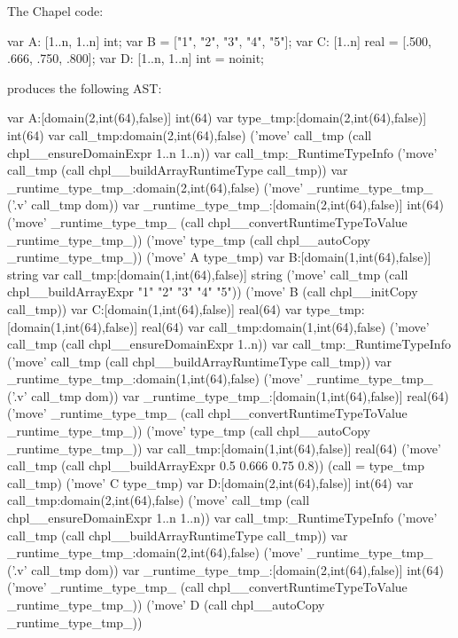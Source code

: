 The Chapel code:
\begin{chapel}
  var A: [1..n, 1..n] int;
  var B = ["1", "2", "3", "4", "5"];
  var C: [1..n] real = [.500, .666, .750, .800];
  var D: [1..n, 1..n] int = noinit;
\end{chapel}
\noindent
produces the following AST:
\begin{numberedchapel}
    var A:[domain(2,int(64),false)] int(64)
    {
      var type_tmp:[domain(2,int(64),false)] int(64)
      var call_tmp:domain(2,int(64),false)
      ('move' call_tmp (call chpl__ensureDomainExpr 1..n 1..n))
      var call_tmp:_RuntimeTypeInfo
      ('move' call_tmp (call chpl__buildArrayRuntimeType call_tmp))
      var _runtime_type_tmp_:domain(2,int(64),false)
      ('move' _runtime_type_tmp_ ('.v' call_tmp dom))
      var _runtime_type_tmp_:[domain(2,int(64),false)] int(64)
      ('move' _runtime_type_tmp_ (call chpl__convertRuntimeTypeToValue _runtime_type_tmp_))
      ('move' type_tmp (call chpl__autoCopy _runtime_type_tmp_))
      ('move' A type_tmp)
    }
    var B:[domain(1,int(64),false)] string
    var call_tmp:[domain(1,int(64),false)] string
    ('move' call_tmp (call chpl__buildArrayExpr "1" "2" "3" "4" "5"))
    ('move' B (call chpl__initCopy call_tmp))
    var C:[domain(1,int(64),false)] real(64)
    {
      var type_tmp:[domain(1,int(64),false)] real(64)
      var call_tmp:domain(1,int(64),false)
      ('move' call_tmp (call chpl__ensureDomainExpr 1..n))
      var call_tmp:_RuntimeTypeInfo
      ('move' call_tmp (call chpl__buildArrayRuntimeType call_tmp))
      var _runtime_type_tmp_:domain(1,int(64),false)
      ('move' _runtime_type_tmp_ ('.v' call_tmp dom))
      var _runtime_type_tmp_:[domain(1,int(64),false)] real(64)
      ('move' _runtime_type_tmp_ (call chpl__convertRuntimeTypeToValue _runtime_type_tmp_))
      ('move' type_tmp (call chpl__autoCopy _runtime_type_tmp_))
      var call_tmp:[domain(1,int(64),false)] real(64)
      ('move' call_tmp (call chpl__buildArrayExpr 0.5 0.666 0.75 0.8))
      (call = type_tmp call_tmp)
      ('move' C type_tmp)
    }
    var D:[domain(2,int(64),false)] int(64)
    var call_tmp:domain(2,int(64),false)
    ('move' call_tmp (call chpl__ensureDomainExpr 1..n 1..n))
    var call_tmp:_RuntimeTypeInfo
    ('move' call_tmp (call chpl__buildArrayRuntimeType call_tmp))
    var _runtime_type_tmp_:domain(2,int(64),false)
    ('move' _runtime_type_tmp_ ('.v' call_tmp dom))
    var _runtime_type_tmp_:[domain(2,int(64),false)] int(64)
    ('move' _runtime_type_tmp_ (call chpl__convertRuntimeTypeToValue _runtime_type_tmp_))
    ('move' D (call chpl__autoCopy _runtime_type_tmp_))
\end{numberedchapel}

